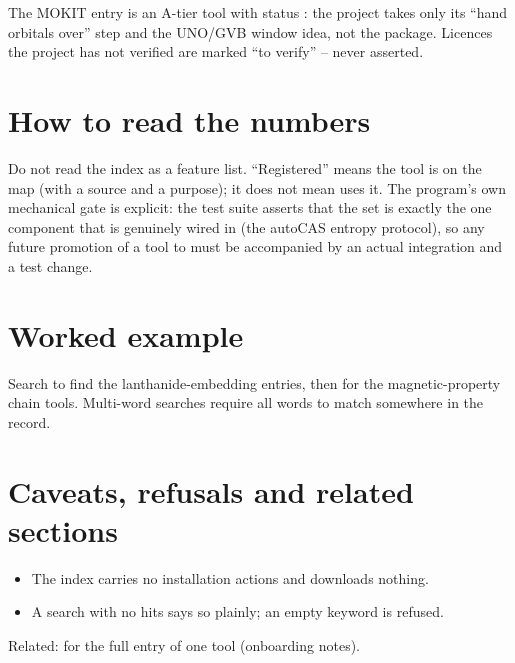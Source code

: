 The MOKIT entry is an A-tier tool with status : the project
takes only its ``hand orbitals over'' step and the UNO/GVB window idea, not the
package. Licences the project has not verified are marked ``to verify'' --
never asserted.

\section{How to read the numbers}

\begin{readbox}
Do not read the index as a feature list. ``Registered'' means the tool is on
the map (with a source and a purpose); it does not mean \fbk{} uses it. The
program's own mechanical gate is explicit: the test suite asserts that the
 set is exactly the one component that is genuinely wired in
(the autoCAS entropy protocol), so any future promotion of a tool to
 must be accompanied by an actual integration and a test change.
\end{readbox}

\section{Worked example}

Search  to find the lanthanide-embedding entries, then
 for the magnetic-property chain tools. Multi-word searches
require all words to match somewhere in the record.

\section{Caveats, refusals and related sections}

\begin{refusalbox}
\begin{itemize}
  \item The index carries no installation actions and downloads nothing.
  \item A search with no hits says so plainly; an empty keyword is refused.
\end{itemize}
\end{refusalbox}

Related:  for the full entry of one tool (onboarding notes).

